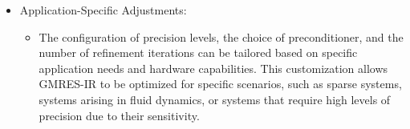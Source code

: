 \begin{itemize}
\begin{itemize}
    \end{itemize}
    \item Application-Specific Adjustments:
    \begin{itemize}
        \item The configuration of precision levels, the choice of preconditioner, and the number of refinement iterations can be tailored based on specific application needs and hardware capabilities. This customization allows GMRES-IR to be optimized for specific scenarios, such as sparse systems, systems arising in fluid dynamics, or systems that require high levels of precision due to their sensitivity.
    \end{itemize}
    \clearpage
\end{itemize}
